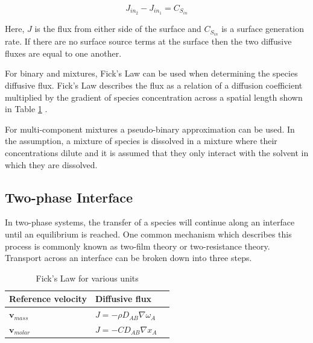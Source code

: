 \begin{equation}
	J_{in_{2}} - J_{in_{1}} = C_{S_{in}}
\end{equation}

Here, $J$ is the flux from either side of the surface and $C_{S_{in}}$ is a surface generation rate. If there are no surface source terms at the surface then the two diffusive fluxes are equal to one another. 


For binary and mixtures, Fick's Law can be used when determining the species diffusive flux. Fick's Law describes the flux as a relation of a diffusion coefficient multiplied by the gradient of species concentration across a spatial length shown in Table \ref{tab:ficks_law} \cite{deen2016}.

For multi-component mixtures a pseudo-binary approximation can be used. In the assumption, a mixture of species is dissolved in a mixture where their concentrations dilute and it is assumed that they only interact with the solvent in which they are dissolved.

\subsection{Two-phase Interface}

In two-phase systems, the transfer of a species will continue along an interface until an equilibrium is reached. One common mechanism which describes this process is commonly known as two-film theory or two-resistance theory. Transport across an interface can be broken down into three steps.

\vspace{12.7mm} %

\begin{table}[htbp!]
   \caption{\label{tab:ficks_law} Fick's Law for various units}
   \centering
   \begin{tabular}{l ll}
   \hline
   \textbf{Reference velocity} & \textbf{Diffusive flux}\\
   \hline 
   ${\textbf{v}_{mass}}$ & $J =  -\rho D_{AB} \nabla \omega_{A}$ \\[1ex]
   ${\textbf{v}_{molar}}$ & $J =  -C D_{AB} \nabla x_{A}$ \\[1ex]
   \hline
   \end{tabular}
\end{table}

